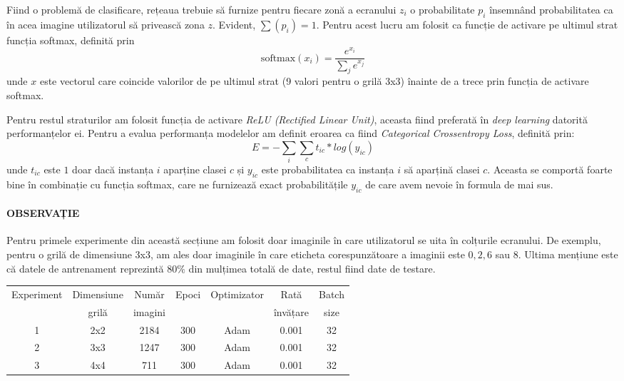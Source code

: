 Fiind o problemă de clasificare, rețeaua trebuie să furnize pentru fiecare zonă a ecranului $z_i$ o probabilitate $p_i$ însemnând probabilitatea ca în acea imagine utilizatorul să privească zona $z$.
Evident, $\sum(p_i) = 1$.
Pentru acest lucru am folosit ca funcție de activare pe ultimul strat funcția softmax, definită prin
$$
\text{softmax}(x_i) = \frac{e^{x_i}}{\sum_j{e^{x_j}}}
$$
unde $x$ este vectorul care coincide valorilor de pe ultimul strat (9 valori pentru o grilă 3x3) înainte de a trece prin funcția de activare softmax.

Pentru restul straturilor am folosit funcția de activare \emph{ReLU (Rectified Linear Unit)}, aceasta fiind preferată în \emph{deep learning} datorită performanțelor ei.
Pentru a evalua performanța modelelor am definit eroarea ca fiind \emph{Categorical Crossentropy Loss}, definită prin:
$$
E = -\sum_{i}{\sum_{c}{t_{ic} * log(y_{ic})}}
$$
unde $t_{ic}$ este $1$ doar dacă instanța $i$ aparține clasei $c$ și $y_{ic}$ este probabilitatea ca instanța $i$ să aparțină clasei $c$.
Aceasta se comportă foarte bine în combinație cu funcția softmax, care ne furnizează exact probabilitățile $y_{ic}$ de care avem nevoie în formula de mai sus.

\paragraph{OBSERVAȚIE}
Pentru primele experimente din această secțiune am folosit doar imaginile în care utilizatorul se uita în colțurile ecranului.
De exemplu, pentru o grilă de dimensiune 3x3, am ales doar imaginile în care eticheta corespunzătoare a imaginii este $0, 2, 6$ sau $8$.
Ultima mențiune este că datele de antrenament reprezintă $80\%$ din mulțimea totală de date, restul fiind date de testare.

\begin{center}
    \begin{tabular}{ c | c | c | c | c | c | c }
        \hline
        Experiment & Dimensiune & Număr   & Epoci & Optimizator & Rată     & Batch \\ 
                   & grilă      & imagini &       &             & învățare & size  \\ 
        \hline
        1 & 2x2 & 2184 & 300 & Adam & 0.001 & 32 \\
        \hline
        2 & 3x3 & 1247 & 300 & Adam & 0.001 & 32 \\
        \hline
        3 & 4x4 & 711 & 300 & Adam & 0.001 & 32 \\
        \hline
    \end{tabular}
\end{center}

